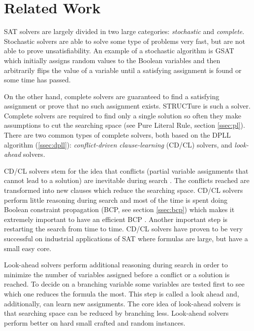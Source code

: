 \chapter{Related Work}
\label{chap:related}

SAT solvers are largely divided in two large categories:
\emph{stochastic} and \emph{complete}.  Stochastic solvers are
able to solve some type of problems very fast, but are not able
to prove unsatisfiability. An example of a stochastic algorithm
is GSAT \cite{Selman95localsearch} which initially assigns random
values to the Boolean variables and then arbitrarily flips the value
of a variable until a satisfying assignment is found or some time
has passed.

On the other hand, complete solvers are guaranteed to find a
satisfying assignment or prove that no such assignment exists.
STRUCTure is such a solver. Complete solvers are required to find
only a single solution so often they make assumptions to cut the
searching space (see Pure Literal Rule, section \ref{ssec:pl}).
There are two common types of complete solvers, both based on
the DPLL algorithm (\ref{ssec:dpll}): \emph{conflict-driven
clause-learning} (CD/CL) solvers, and \emph{look-ahead} solvers.

CD/CL solvers stem for the idea that conflicts (partial variable
assignments that cannot lead to a solution) are inevitable during
search \cite{Marques-silva99grasp:a}. The conflicts reached are
transformed into new clauses which reduce the searching space.
CD/CL solvers perform little reasoning during search and most
of the time is spent doing Boolean constraint propagation (BCP,
see section \ref{ssec:bcp}) which makes it extremely important to
have an efficient BCP \cite{Moskewicz:2001:CEE:378239.379017}. Another
important step is restarting the search from time to time. CD/CL
solvers have proven to be very successful on industrial applications
of SAT where formulas are large, but have a small easy core.

Look-ahead solvers perform additional reasoning during search in
order to minimize the number of variables assigned before a conflict
or a solution is reached. To decide on a branching variable
some variables are tested first to see which one reduces the formula
the most. This step is called a look ahead and, additionally,
can learn new assignments. The core idea of look-ahead solvers is
that searching space can be reduced by branching less. Look-ahead
solvers perform better on hard small crafted and random instances.

